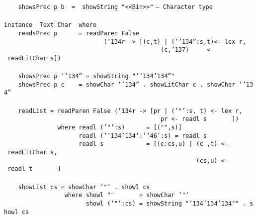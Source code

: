 \mbox{\tt \ \ \ \ showsPrec\ p\ b\ \ =\ \ showString\ "<<Bin>>"}
%
\eprogB\noindent\bprogB
\mbox{\tt --\ Character\ type}\\
\mbox{\tt }\\[-8pt]
\mbox{\tt instance\ \ Text\ Char\ \ where}\\
\mbox{\tt \ \ \ \ readsPrec\ p\ \ \ \ \ \ =\ readParen\ False}\\
\mbox{\tt \ \ \ \ \ \ \ \ \ \ \ \ \ \ \ \ \ \ \ \ \ \ \ \ \ \ \ \ ({\char'134}r\ ->\ [(c,t)\ |\ ('{\char'134}'':s,t)<-\ lex\ r,}\\
\mbox{\tt \ \ \ \ \ \ \ \ \ \ \ \ \ \ \ \ \ \ \ \ \ \ \ \ \ \ \ \ \ \ \ \ \ \ \ \ \ \ \ \ \ \ \ \ (c,{\char'137})\ \ \ \ \ <-\ readLitChar\ s])}\\
\mbox{\tt }\\[-8pt]
\mbox{\tt \ \ \ \ showsPrec\ p\ '{\char'134}''\ =\ showString\ "'{\char'134}{\char'134}''"}\\
\mbox{\tt \ \ \ \ showsPrec\ p\ c\ \ \ \ =\ showChar\ '{\char'134}''\ .\ showLitChar\ c\ .\ showChar\ '{\char'134}''}\\
\mbox{\tt }\\[-8pt]
\mbox{\tt \ \ \ \ readList\ =\ readParen\ False\ ({\char'134}r\ ->\ [pr\ |\ ('"':s,\ t)\ <-\ lex\ r,}\\
\mbox{\tt \ \ \ \ \ \ \ \ \ \ \ \ \ \ \ \ \ \ \ \ \ \ \ \ \ \ \ \ \ \ \ \ \ \ \ \ \ \ \ \ \ \ \ \ pr\ <-\ readl\ s\ \ \ \ \ \ \ ])}\\
\mbox{\tt \ \ \ \ \ \ \ \ \ \ \ \ \ \ \ where\ readl\ ('"':s)\ \ \ \ \ \ =\ [("",s)]}\\
\mbox{\tt \ \ \ \ \ \ \ \ \ \ \ \ \ \ \ \ \ \ \ \ \ readl\ ('{\char'134}{\char'134}':'{\char'46}':s)\ =\ readl\ s}\\
\mbox{\tt \ \ \ \ \ \ \ \ \ \ \ \ \ \ \ \ \ \ \ \ \ readl\ s\ \ \ \ \ \ \ \ \ \ \ \ =\ [(c:cs,u)\ |\ (c\ ,t)\ <-\ readLitChar\ s,}\\
\mbox{\tt \ \ \ \ \ \ \ \ \ \ \ \ \ \ \ \ \ \ \ \ \ \ \ \ \ \ \ \ \ \ \ \ \ \ \ \ \ \ \ \ \ \ \ \ \ \ \ \ \ \ \ \ \ \ (cs,u)\ <-\ readl\ t\ \ \ \ \ \ \ ]}\\
\mbox{\tt }\\[-8pt]
\mbox{\tt \ \ \ \ showList\ cs\ =\ showChar\ '"'\ .\ showl\ cs}\\
\mbox{\tt \ \ \ \ \ \ \ \ \ \ \ \ \ \ \ \ \ where\ showl\ ""\ \ \ \ \ \ \ =\ showChar\ '"'}\\
\mbox{\tt \ \ \ \ \ \ \ \ \ \ \ \ \ \ \ \ \ \ \ \ \ \ \ showl\ ('"':cs)\ =\ showString\ "{\char'134}{\char'134}{\char'134}""\ .\ showl\ cs}\\
